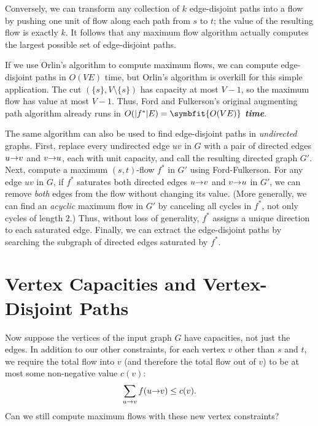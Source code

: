 Conversely, we can transform any collection of $k$ edge-disjoint paths into a flow by pushing one unit of flow along each path from $s$ to $t$; the value of the resulting flow is exactly $k$.
It follows that any maximum flow algorithm actually computes the largest possible set of edge-disjoint paths.

If we use Orlin’s algorithm to compute maximum flows, we can compute edge-disjoint paths in $O(VE)$ time, but Orlin’s algorithm is overkill for this simple application.
The cut $(\{s\}, V \setminus \{s\})$ has capacity at most $V - 1$, so the maximum flow has value at most $V - 1$.
Thus, Ford and Fulkerson’s original augmenting path algorithm already runs in $O(|f^*|E) = \symbfit{O(VE)}$ \textbf{\textit{time}}.

The same algorithm can also be used to find edge-disjoint paths in \textit{undirected} graphs.
First, replace every undirected edge $uv$ in $G$ with a pair of directed edges $u\mathord{\rightarrow}v$ and $v\mathord{\rightarrow}u$, each with unit capacity, and call the resulting directed graph $G'$.
Next, compute a maximum $(s,t)$-flow $f^*$ in $G'$ using Ford-Fulkerson.
For any edge $uv$ in $G$, if $f^*$ saturates both directed edges $u\mathord{\rightarrow}v$ and $v\mathord{\rightarrow}u$ in $G'$, we can remove \textit{both} edges from the flow without changing its value.
(More generally, we can find an \textit{acyclic} maximum flow in $G'$ by canceling all cycles in $f^*$, not only cycles of length $2$.)
Thus, without loss of generality, $f^*$ assigns a unique direction to each saturated edge.
Finally, we can extract the edge-disjoint paths by searching the subgraph of directed edges saturated by $f^*$.

\section{Vertex Capacities and Vertex-Disjoint Paths}
\label{sec:11.2}

Now suppose the vertices of the input graph $G$ have capacities, not just the edges.
In addition to our other constraints, for each vertex $v$ other than $s$ and $t$, we require the total flow into $v$ (and therefore the total flow out of $v$) to be at most some non-negative value $c(v)$:
\[
\sum_{u\mathord{\rightarrow}v} f(u\mathord{\rightarrow}v) \le c(v).
\]
Can we still compute maximum flows with these new vertex constraints?

